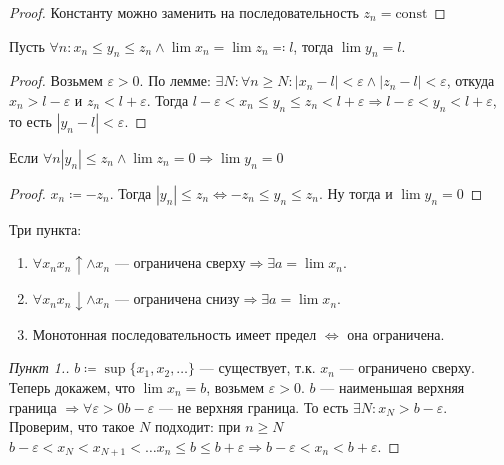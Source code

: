  \begin{proof}
     Константу можно заменить на последовательность $z_n = \text{const}$
\end{proof}
\begin{theorem}
    Пусть $\forall n: x_n \le y_n \le z_n \land \lim x_n = \lim z_n \eqqcolon l$, тогда $\lim y_n = l$.
\end{theorem}
\begin{proof}
    Возьмем $\varepsilon > 0$. По лемме:  $\exists N: \forall n \ge N: |x_n-l| < \varepsilon \land |z_n-l| < \varepsilon$, откуда $x_n > l - \varepsilon$ и  $z_n < l + \varepsilon$. Тогда  $l - \varepsilon < x_n \le y_n \le z_n < l + \varepsilon \Rightarrow l - \varepsilon < y_n < l + \varepsilon$, то есть $|y_n - l| < \varepsilon$.
\end{proof}
\begin{consequence}
     Если $\forall n |y_n| \le z_n \land \lim z_n = 0 \Rightarrow \lim y_n = 0$
\end{consequence}
\begin{proof}
    $x_n \coloneqq -z_n$. Тогда  $|y_n| \le z_n \iff -z_n \le y_n \le z_n$. Ну тогда и $\lim y_n = 0$
\end{proof}
\begin{theorem}
    Три пункта:
    \begin{enumerate}
        \item $\forall x_n x_n \uparrow \land x_n\text{ --- ограничена сверху} \Rightarrow \exists a = \lim x_n$.
        \item $\forall x_n x_n \downarrow \land x_n\text{ --- ограничена снизу} \Rightarrow \exists a = \lim x_n$. 
        \item Монотонная последовательность имеет предел $\iff$ она ограничена.
    \end{enumerate}
\end{theorem}
\begin{proof}[Пункт 1.]
    $b \coloneqq \sup \{x_1,x_2,\ldots\}$ --- существует, т.к. $x_n$ --- ограничено сверху. Теперь докажем, что  $\lim x_n = b$, возьмем  $\varepsilon > 0$. $b$ --- наименьшая верхняя граница  $\Rightarrow \forall \varepsilon > 0 b - \varepsilon$ --- не верхняя граница. То есть  $\exists N: x_N > b - \varepsilon$. Проверим, что такое  $N$ подходит: при  $n \ge N$ $b - \varepsilon < x_N < x_{N+1} < \ldots x_n \le b \le b + \varepsilon \Rightarrow b - \varepsilon < x_n < b + \varepsilon$.
\end{proof}
